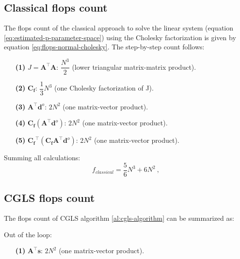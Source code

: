 
\subsection{Classical flops count}

The flops count of the classical approach to solve the linear system (equation \ref{eq:estimated-p-parameter-space}) using the Cholesky factorization is given by equation \ref{eq:flops-normal-cholesky}. The step-by-step count follows:
\begin{itemize}
\item[\textbf{(1)}] $J = \mathbf{A}^{\top}\mathbf{A}$: $\dfrac{N^3}{2}$ (lower triangular matrix-matrix product).

\item[\textbf{(2)}] $\mathbf{C_f}: \, \dfrac{1}{3} N^3$ (one Cholesky factorization of J).

\item[\textbf{(3)}] $\mathbf{A}^{\top} \mathbf{d}^{o}$: $2 N^2$ (one matrix-vector product).

\item[\textbf{(4)}] $\mathbf{C_f} (\mathbf{A}^{\top} \mathbf{d}^{o})$: $2 N^2$ (one matrix-vector product).

\item[\textbf{(5)}] $\mathbf{C_f}^{\top} (\mathbf{C_f} \mathbf{A}^{\top} \mathbf{d}^{o})$: $2 N^2$ (one matrix-vector product).
\end{itemize}
Summing all calculations: 
\begin{equation}
f_{classical} =  \dfrac{5}{6} N^{3} + 6 N^{2}\: ,
\label{eq:flops-normal-cholesky-append}
\end{equation}

\subsection{CGLS flops count}

The flops count of CGLS algorithm \ref{al:cgls-algorithm} can be summarized as:

Out of the loop:

\begin{itemize}

\item[\textbf{(1)}] $\mathbf{A}^{\top} \mathbf{s}$: $2 N^2$ (one matrix-vector product).
\end{itemize}

